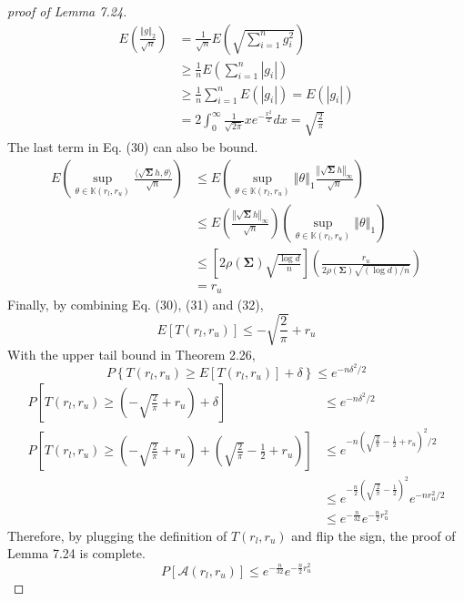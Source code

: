 \documentclass[a4paper, 11pt]{article}
\begin{document}
\begin{proof}[proof of Lemma 7.24]
\begin{equation}
\begin{split}
E\left(\frac{\left\Vert g \right\Vert_2}{\sqrt{n}} \right) & = \frac{1}{\sqrt{n}}E\left(\sqrt{\sum_{i=1}^n g_i^2} \right)\\
 & \geq \frac{1}{n} E\left(\sum_{i=1}^n |g_i| \right)\\
 & \geq \frac{1}{n}\sum_{i=1}^n E(|g_i|) = E(|g_i|)\\
 & = 2\int_0^\infty \frac{1}{\sqrt{2\pi}}xe^{-\frac{x^2}{2}}dx = \sqrt{\frac{2}{\pi}}
\end{split}
\end{equation}
The last term in Eq. (30) can also be bound. 
\begin{equation}
\begin{split}
E\left(\sup_{\theta\in{\mathbb{K}}(r_l, r_u)}\frac{\langle \sqrt{\mathbf{\Sigma}}h, \theta \rangle}{\sqrt{n}}\right) & \leq E\left(\sup_{\theta\in{\mathbb{K}}(r_l, r_u)} \left\Vert\theta\right\Vert_1\frac{\left\Vert\sqrt{\mathbf{\Sigma}}h\right\Vert_\infty}{\sqrt{n}}\right)\\
 & \leq E\left(\frac{\left\Vert\sqrt{\mathbf{\Sigma}}h\right\Vert_\infty}{\sqrt{n}} \right)\left(\sup_{\theta\in{\mathbb{K}}(r_l, r_u)} \left\Vert\theta\right\Vert_1\right)\\
 & \leq \left[2\rho(\mathbf{\Sigma})\sqrt{\frac{\log d}{n}} \right]\left(\frac{r_u}{2\rho(\mathbf{\Sigma})\sqrt{(\log d) / n}} \right) \\ 
 & = r_u
\end{split}
\end{equation}
Finally, by combining Eq. (30), (31) and (32), 
\begin{equation}
E\left[T(r_l, r_u) \right]\leq - \sqrt{\frac{2}{\pi}} + r_u
\end{equation}
With the upper tail bound in Theorem 2.26,
\begin{equation}
P\left\{T(r_l, r_u)\geq E\left[T(r_l, r_u) \right] + \delta \right\} \leq e^{-n\delta^2/2}
\end{equation}
\begin{equation}
\begin{split}
P\left[T(r_l, r_u) \geq \left(- \sqrt{\frac{2}{\pi}} + r_u\right) + \delta \right] & \leq e^{-n\delta^2/2}\\
P\left[T(r_l, r_u) \geq \left(- \sqrt{\frac{2}{\pi}} + r_u\right) + \left(\sqrt{\frac{2}{\pi}}-\frac{1}{2}+r_u \right) \right] & \leq e^{-n\left(\sqrt{\frac{2}{\pi}}-\frac{1}{2}+r_u \right)^2/2}\\
 & \leq e^{-\frac{n}{2}\left(\sqrt{\frac{2}{\pi}}-\frac{1}{2}\right)^2}e^{-nr_u^2/2} \\
 & \leq e^{-\frac{n}{32}}e^{-\frac{n}{2}r_u^2}
\end{split}
\end{equation}
Therefore, by plugging the definition of $T(r_l, r_u)$ and flip the sign, the proof of Lemma 7.24 is complete. 
\begin{equation}
P\left[\mathcal{A}(r_l, r_u)\right] \leq e^{-\frac{n}{32}}e^{-\frac{n}{2}r_u^2}
\end{equation}

\end{proof}
\end{document}
